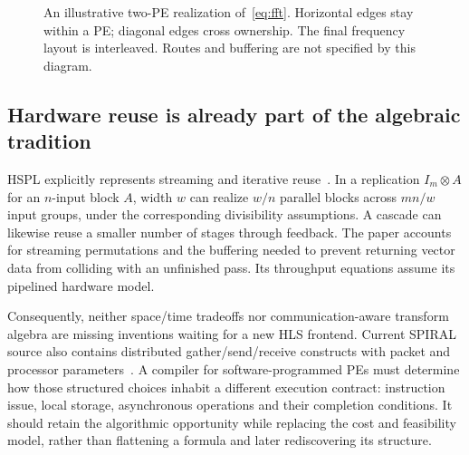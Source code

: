 \documentclass[final,3p,times,authoryear]{elsarticle}
\providecommand{\Description}[1]{}
\begin{document}
\begin{figure}[t]
\centering
{}
\caption{An illustrative two-PE realization of~\eqref{eq:fft}. Horizontal edges stay within a PE; diagonal edges cross ownership. The final frequency layout is interleaved. Routes and buffering are not specified by this diagram.}
\Description{Two rows show two processing elements. Input redistribution and intermediate butterfly values cross between rows before the final butterfly outputs.}
\label{fig:fft}
\end{figure}

\subsection{Hardware reuse is already part of the algebraic tradition}
HSPL explicitly represents streaming and iterative reuse~\citep{milder2012}. In a replication $I_m\otimes A$ for an $n$-input block $A$, width $w$ can realize $w/n$ parallel blocks across $mn/w$ input groups, under the corresponding divisibility assumptions. A cascade can likewise reuse a smaller number of stages through feedback. The paper accounts for streaming permutations and the buffering needed to prevent returning vector data from colliding with an unfinished pass. Its throughput equations assume its pipelined hardware model.

Consequently, neither space/time tradeoffs nor communication-aware transform algebra are missing inventions waiting for a new HLS frontend. Current SPIRAL source also contains distributed gather/send/receive constructs with packet and processor parameters~\citep{spiralsource2026}. A compiler for software-programmed PEs must determine how those structured choices inhabit a different execution contract: instruction issue, local storage, asynchronous operations and their completion conditions. It should retain the algorithmic opportunity while replacing the cost and feasibility model, rather than flattening a formula and later rediscovering its structure.
\end{document}
